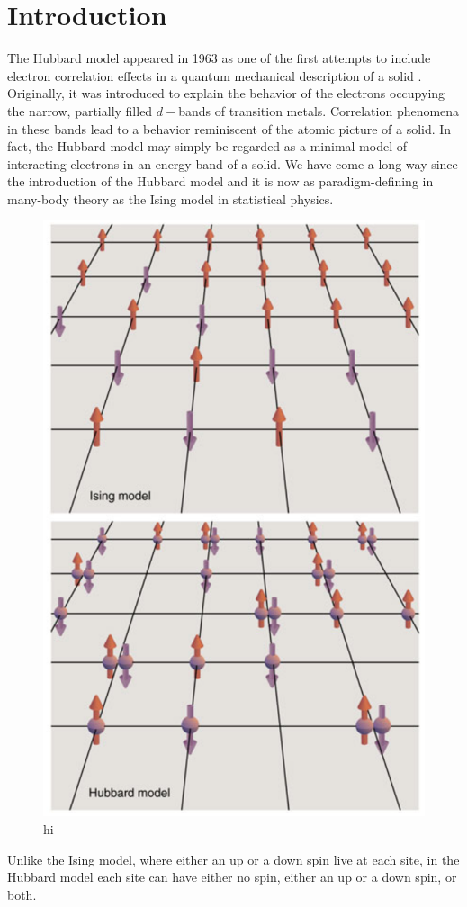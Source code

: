 \section{Introduction}\label{sec:intro}

The Hubbard model appeared in 1963 as one of the first attempts to include electron correlation effects in a quantum mechanical description of a solid \cite{Hubbard1963}. Originally, it was introduced to explain the behavior of the electrons occupying the narrow, partially filled $d-$bands of transition metals. Correlation phenomena in these bands lead to a behavior reminiscent of the atomic picture of a solid. In fact, the Hubbard model may simply be regarded as a minimal model of interacting electrons in an energy band of a solid. We have come a long way since the introduction of the Hubbard model and it is now as paradigm-defining in many-body theory as the Ising model in statistical physics\cite{Mahan2000}.

\begin{figure}[H]
	\centering
\includegraphics[width=0.5\linewidth]{Figures/3.HubbardModel/isingVsHubbard}
	\caption[Graphical comparison between the Ising and the Hubbard model.]{hi}
	\label{fig:dummyfigure1}
\end{figure}

Unlike the Ising model, where either an up or a down spin live at each site, in the Hubbard model each site can have either no spin, either an up or a down spin, or both.

